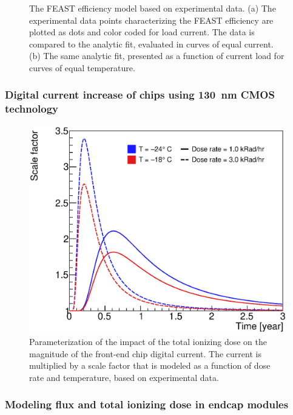 \begin{figure}[ht]
\centering
{}
\caption{The FEAST efficiency model based on experimental data. (a) The experimental data points
characterizing the FEAST efficiency are plotted as dots and color coded for load current. The data is
compared to the analytic fit, evaluated in curves of equal current. (b) The same analytic fit,
presented as a function of current load for curves of equal temperature.
}
\label{fig:feast_eff}
\end{figure}


\subsubsection{Digital current increase of chips using 130~nm CMOS technology}

\begin{figure}[ht]
\centering
\includegraphics[width=0.6\linewidth]{figures/AbcTidBumpVersionRatesAndTemps_Nominal.eps}
\caption{Parameterization of the impact of the total ionizing dose
on the magnitude of the front-end chip digital current. The current is multiplied by a scale factor
that is modeled as a function of dose rate and temperature, based on experimental data.}
\label{tid_bump}
\end{figure}

\subsubsection{Modeling flux and total ionizing dose in endcap modules}

